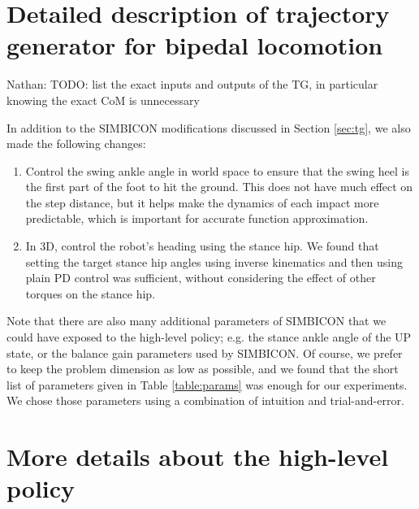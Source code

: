 \documentclass[conference]{IEEEtran}
\newcommand{\nhatch}[1]{{\leavevmode\color{magenta} Nathan: #1}}
\begin{document}




\appendix

\section{Detailed description of trajectory generator for bipedal locomotion}

\label{app:simbicon}

\nhatch{TODO: list the exact inputs and outputs of the TG, in particular knowing the exact CoM is unnecessary}

In addition to the SIMBICON modifications discussed in Section \ref{sec:tg}, we also made the following changes:

\begin{enumerate}

  \item Control the swing ankle angle in world space to ensure that the swing heel is the first part of the foot to hit the ground.
    This does not have much effect on the step distance, but it helps make the dynamics of each impact more predictable, which is important for accurate function approximation.

  \item In 3D, control the robot's heading using the stance hip.
    We found that setting the target stance hip angles using inverse kinematics and then using plain PD control was sufficient, without considering the effect of other torques on the stance hip.
\end{enumerate}

Note that there are also many additional parameters of SIMBICON that we could have exposed to the high-level policy; e.g. the stance ankle angle of the UP state, or the balance gain parameters used by SIMBICON.
Of course, we prefer to keep the problem dimension as low as possible, and we found that the short list of parameters given in Table \ref{table:params} was enough for our experiments.
We chose those parameters using a combination of intuition and trial-and-error.

\section{More details about the high-level policy}
\end{document}
